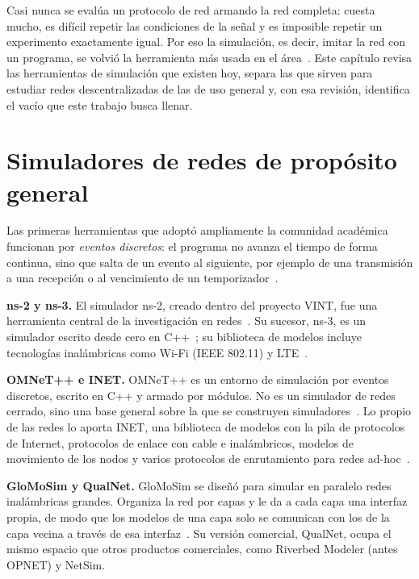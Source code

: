 
Casi nunca se evalúa un protocolo de red armando la red completa: cuesta mucho,
es difícil repetir las condiciones de la señal y es imposible repetir un
experimento exactamente igual. Por eso la simulación, es decir, imitar la red con
un programa, se volvió la herramienta más usada en el
área~\cite{Wehrle2010Modeling,Kiess2007RealWorld}. Este capítulo revisa las
herramientas de simulación que existen hoy, separa las que sirven para estudiar
redes descentralizadas de las de uso general y, con esa revisión, identifica el
vacío que este trabajo busca llenar.

\section{Simuladores de redes de propósito general}
\label{sec:simuladores-generales}

Las primeras herramientas que adoptó ampliamente la comunidad académica funcionan
por \textit{eventos discretos}: el programa no avanza el tiempo de forma continua,
sino que salta de un evento al siguiente, por ejemplo de una transmisión a una
recepción o al vencimiento de un temporizador~\cite{Wehrle2010Modeling}.

\textbf{ns-2 y ns-3.} El simulador ns-2, creado dentro del proyecto VINT, fue una
herramienta central de la investigación en redes~\cite{Breslau2000Advances}. Su
sucesor, ns-3, es un simulador escrito desde cero en C++~\cite{Riley2010ns3}; su
biblioteca de modelos incluye tecnologías inalámbricas como Wi-Fi (IEEE 802.11) y
LTE~\cite{Ns3Modelos}.

\textbf{OMNeT++ e INET.} OMNeT++ es un entorno de simulación por eventos
discretos, escrito en C++ y armado por módulos. No es un simulador de redes
cerrado, sino una base general sobre la que se construyen
simuladores~\cite{Varga2008Omnetpp}. Lo propio de las redes lo aporta INET, una
biblioteca de modelos con la pila de protocolos de Internet, protocolos de enlace
con cable e inalámbricos, modelos de movimiento de los nodos y varios protocolos
de enrutamiento para redes ad-hoc~\cite{InetFramework}.

\textbf{GloMoSim y QualNet.} GloMoSim se diseñó para simular en paralelo redes
inalámbricas grandes. Organiza la red por capas y le da a cada capa una interfaz
propia, de modo que los modelos de una capa solo se comunican con los de la capa
vecina a través de esa interfaz~\cite{Zeng1998Glomosim}. Su versión comercial,
QualNet, ocupa el mismo espacio que otros productos comerciales, como Riverbed
Modeler (antes OPNET) y NetSim.

